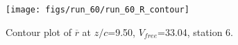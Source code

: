 \begin{figure}[H]
\centering
\texttt{[image: figs/run\_60/run\_60\_R\_contour]}
\caption{Contour plot of $\overline{r}$ at $z/c$=9.50, $V_{free}$=33.04, station 6.}
\label{fig:run_60_R_contour}
\end{figure}



